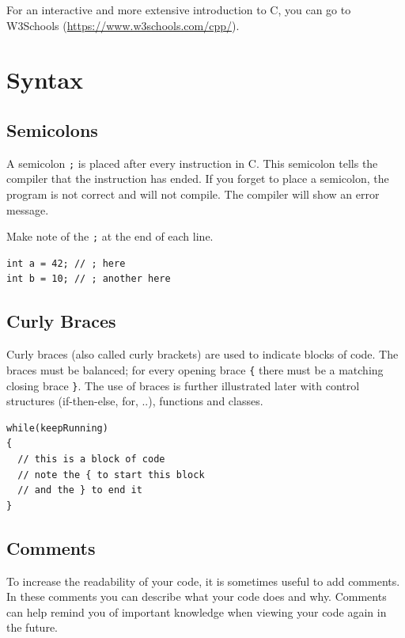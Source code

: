 \documentclass[11pt,fleqn]{book} %
\def\Cpp{{C\nolinebreak[4]\hspace{-.05em}\raisebox{.4ex}{\tiny\bf ++}}}
\begin{document}
\noindent For an interactive and more extensive introduction to \Cpp, you can go to W3Schools (\url{https://www.w3schools.com/cpp/}).

\nocite{w3schools:cpp, tutorialspoint:cpp}

\section{Syntax}
\subsection{Semicolons}
A semicolon \texttt{;} is placed after every instruction in \Cpp{}. This semicolon tells the compiler that the instruction has ended. If you forget to place a semicolon, the program is not correct and will not compile. The compiler will show an error message.

\begin{example}
	\phantom{ }
	Make note of the \texttt{;} at the end of each line.
	\begin{verbatim}
int a = 42; // ; here
int b = 10; // ; another here
	\end{verbatim}
\end{example}

\pagebreak

\subsection{Curly Braces}
Curly braces \texttt{{}} (also called curly brackets) are used to indicate blocks of code. The braces must be balanced; for every opening brace \texttt{\{} there must be a matching closing brace \texttt{\}}. The use of braces is further illustrated later with control structures (if-then-else, for, ..), functions and classes.

\begin{example}
	\phantom{ }
	\begin{verbatim}
while(keepRunning)
{
  // this is a block of code
  // note the { to start this block
  // and the } to end it
}
	\end{verbatim}
\end{example}

\subsection{Comments}
To increase the readability of your code, it is sometimes useful to add comments. In these comments you can describe what your code does and why. Comments can help remind you of important knowledge when viewing your code again in the future.\\
\end{document}
